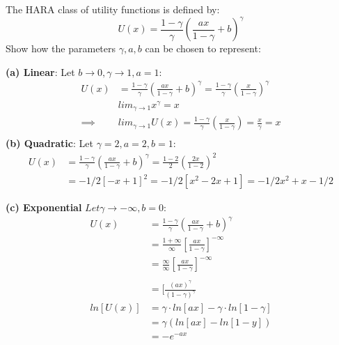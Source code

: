 \documentclass[12pt]{article}
\newenvironment{problem}[3][Problem]{\begin{trivlist}
\item[\hskip \labelsep {\bfseries #1}\hskip \labelsep {\bfseries #2.}]}{\end{trivlist}}
\begin{document}
\begin{problem}{6 (HARA)}. The HARA class of utility functions is defined by: 
$$ U(x) = \frac{1-\gamma }{\gamma } (\frac{ax}{1-\gamma } + b)^{\gamma } $$ 
Show how the parameters $\gamma , a, b $ can be chosen to represent: 

\textbf{(a) Linear}: Let $b\rightarrow 0, \gamma \rightarrow 1, a = 1$:
\begin{align*}
U(x) &= \frac{1-\gamma }{\gamma } (\frac{ax}{1-\gamma } + b)^{\gamma } = \frac{1-\gamma }{\gamma } (\frac{x}{1-\gamma } )^{\gamma } \\
&lim_{\gamma \rightarrow 1}x^{\gamma} = x \\
\implies&  lim_{\gamma \rightarrow 1} U(x) = \frac{1-\gamma }{\gamma } (\frac{x}{1-\gamma } ) = \frac{x}{\gamma } = x \\ 
\end{align*}
\textbf{(b) Quadratic}: Let $\gamma = 2, a=2, b=1$: 
\begin{align*}
U(x) &= \frac{1-\gamma }{\gamma } (\frac{ax}{1-\gamma } + b)^{\gamma } = \frac{1-2 }{2 } (\frac{2x}{1-2 } )^{2} \\
&= -1/2[-x+1]^2 = -1/2[x^2 - 2x + 1] = -1/2x^2 + x - 1/2 
\end{align*}

\textbf{(c) Exponential} $Let \gamma \rightarrow -\infty , b=0$:
\begin{align*}
U(x) &= \frac{1-\gamma }{\gamma } (\frac{ax}{1-\gamma } + b)^{\gamma } \\
&= \frac{1+\infty}{\infty } [\frac{ax}{1-\gamma }]^{-\infty} \\
&= \frac{\infty}{\infty } [\frac{ax}{1-\gamma }]^{-\infty} \\ \\
&= [\frac{(ax)^{\gamma }}{(1-\gamma )^{\gamma }} \\
ln[U(x)] &= \gamma \cdot ln[ax] - \gamma\cdot ln[1-\gamma ]\\
&= \gamma ( ln[ax] - ln[1-y] ) \\
&=- e^{-ax}
\end{align*}


\end{problem}
\end{document}
